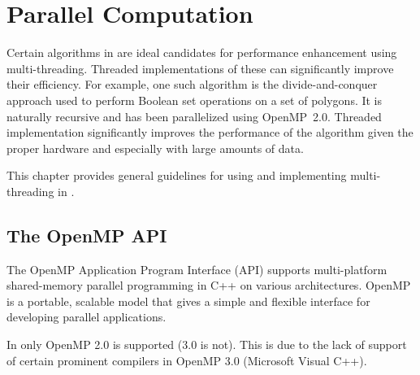 
\chapter{Parallel Computation\label{chap:parallel_computation}}

Certain algorithms in \cgal{} are ideal candidates for performance
enhancement using multi-threading. Threaded implementations of these
can significantly improve their efficiency.
For example, one such algorithm is the divide-and-conquer approach
used to perform Boolean set operations on a set of polygons. It is
naturally recursive and has been parallelized using
OpenMP~2.0. Threaded implementation significantly improves the performance
of the algorithm given the proper hardware and especially with large
amounts of data.

This chapter provides general guidelines for using and implementing
multi-threading in \cgal{}.

\section{The OpenMP API\label{sec:openmp}}
The OpenMP Application Program Interface (API) supports multi-platform
shared-memory parallel programming in C++ on various
architectures. OpenMP is a portable, scalable model that gives a
simple and flexible interface for developing parallel applications.

In \cgal{} only OpenMP 2.0 is supported (3.0 is not). This is due to
the lack of support of certain prominent compilers in OpenMP 3.0
(Microsoft Visual C++).




